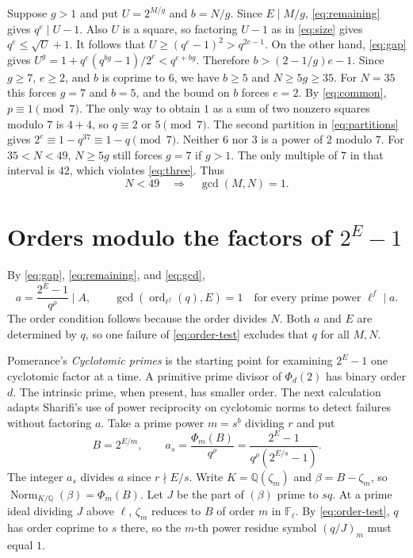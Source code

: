 \documentclass[11pt]{article}
\DeclareMathOperator{\ord}{ord}
\begin{document}
Suppose $g>1$ and put $U=2^{M/g}$ and $b=N/g$. Since $E\mid M/g$,
\eqref{eq:remaining} gives $q^e\mid U-1$. Also $U$ is a square,
so factoring $U-1$ as in \eqref{eq:size} gives $q^e\le\sqrt U+1$.
It follows that $U\ge(q^e-1)^2>q^{2e-1}$. On the other hand,
\eqref{eq:gap} gives $U^g=1+q^e(q^{bg}-1)/2^c<q^{e+bg}$.
Therefore $b>(2-1/g)e-1$. Since $g\ge7$, $e\ge2$, and $b$ is coprime
to $6$, we have $b\ge5$ and $N\ge5g\ge35$.
For $N=35$ this forces $g=7$ and $b=5$, and the bound on $b$ forces $e=2$.
By \eqref{eq:common}, $p\equiv1\pmod7$. The only way to obtain $1$
as a sum of two nonzero squares modulo $7$ is $4+4$, so
$q\equiv2$ or $5\pmod7$. The second partition in
\eqref{eq:partitions} gives $2^c\equiv1-q^{37}\equiv1-q\pmod7$.
Neither $6$ nor $3$ is a power of $2$ modulo $7$.
For $35<N<49$, $N\ge5g$ still forces $g=7$ if $g>1$. The only
multiple of $7$ in that interval is $42$, which violates \eqref{eq:three}. Thus
\begin{equation}\label{eq:N49}
N<49\quad\Longrightarrow\quad \gcd(M,N)=1.
\end{equation}

\section{Orders modulo the factors of \texorpdfstring{$2^E-1$}{2\string^E-1}}
\label{sec:orders}

By \eqref{eq:gap}, \eqref{eq:remaining}, and \eqref{eq:gcd},
\begin{equation}\label{eq:order-test}
a=\frac{2^E-1}{q^\rho}\mid A,\qquad
\gcd(\ord_{\ell^f}(q),E)=1
\quad\text{for every prime power }\ell^f\mid a.
\end{equation}
The order condition follows because the order divides $N$.
Both $a$ and $E$ are determined by $q$, so one failure of
\eqref{eq:order-test} excludes that $q$ for all $M,N$.

Pomerance's \emph{Cyclotomic primes} \cite[\S2]{PomCycl} is the
starting point for examining $2^E-1$ one cyclotomic factor at a
time. A primitive prime divisor of $\Phi_d(2)$ has binary order
$d$. The intrinsic prime, when present, has smaller order.
The next calculation adapts Sharifi's use of power reciprocity
on cyclotomic norms to detect failures without factoring $a$.
Take a prime power $m=s^b$ dividing $r$ and put
\[
B=2^{E/m},\qquad
a_s=\frac{\Phi_m(B)}{q^\rho}
=\frac{2^E-1}{q^\rho(2^{E/s}-1)}.
\]
The integer $a_s$ divides $a$ since $r\nmid E/s$. Write
$K=\mathbb Q(\zeta_m)$ and $\beta=B-\zeta_m$, so
$\operatorname{Norm}_{K/\mathbb Q}(\beta)=\Phi_m(B)$.
Let $J$ be the part of $(\beta)$ prime to $sq$. At a prime ideal
dividing $J$ above $\ell$, $\zeta_m$ reduces to $B$ of order $m$ in
$\mathbb F_\ell$. By \eqref{eq:order-test}, $q$ has order coprime to
$s$ there, so the $m$-th power residue symbol $(q/J)_m$ must equal $1$.
\end{document}
